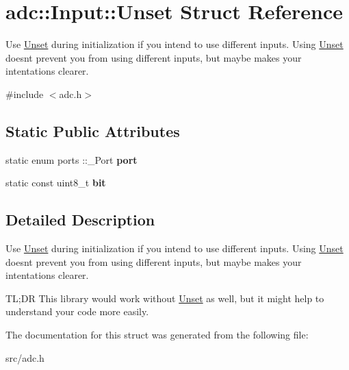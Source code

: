 \hypertarget{structadc_1_1Input_1_1Unset}{}\section{adc\+:\+:Input\+:\+:Unset Struct Reference}
\label{structadc_1_1Input_1_1Unset}


Use \hyperlink{structadc_1_1Input_1_1Unset}{Unset} during initialization if you intend to use different inputs. Using \hyperlink{structadc_1_1Input_1_1Unset}{Unset} doesn\textquotesingle{}t prevent you from using different inputs, but maybe makes your intentations clearer.  




{\ttfamily \#include $<$adc.\+h$>$}

\subsection*{Static Public Attributes}
\begin{DoxyCompactItemize}
\item 
\hypertarget{structadc_1_1Input_1_1Unset_a868a4d7db05686d8b09a4a5f9ca3f863}{}\label{structadc_1_1Input_1_1Unset_a868a4d7db05686d8b09a4a5f9ca3f863} 
static enum ports \+::\+\_\+\+Port {\bfseries port}
\item 
\hypertarget{structadc_1_1Input_1_1Unset_a8fd44d9636034cbba06a1673af4dfa1a}{}\label{structadc_1_1Input_1_1Unset_a8fd44d9636034cbba06a1673af4dfa1a} 
static const uint8\+\_\+t {\bfseries bit}
\end{DoxyCompactItemize}


\subsection{Detailed Description}
Use \hyperlink{structadc_1_1Input_1_1Unset}{Unset} during initialization if you intend to use different inputs. Using \hyperlink{structadc_1_1Input_1_1Unset}{Unset} doesn\textquotesingle{}t prevent you from using different inputs, but maybe makes your intentations clearer. 

TL;DR This library would work without \hyperlink{structadc_1_1Input_1_1Unset}{Unset} as well, but it might help to understand your code more easily. 

The documentation for this struct was generated from the following file\+:\begin{DoxyCompactItemize}
\item 
src/adc.\+h\end{DoxyCompactItemize}
